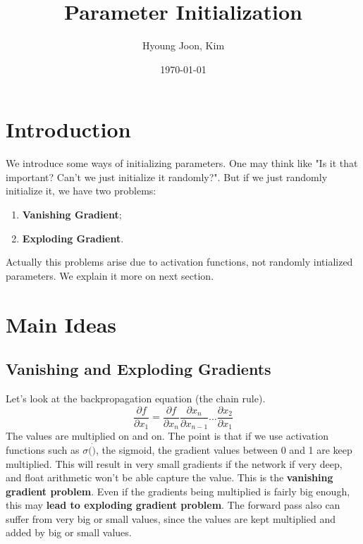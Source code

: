 \documentclass{article}
\title{Parameter Initialization}
\author{Hyoung Joon, Kim}
\date{\today}
\begin{document}
\maketitle
\tableofcontents
\newpage

\section{Introduction}
    We introduce some ways of initializing parameters. One may think like "Is it that important? Can't we just initialize it randomly?".
    But if we just randomly initialize it, we have two problems:
    \begin{enumerate}
        \item \textbf{Vanishing Gradient};
        \item \textbf{Exploding Gradient}.
    \end{enumerate}
    Actually this problems arise due to activation functions, not randomly intialized parameters.
    We explain it more on next section.
\section{Main Ideas}
    \subsection{Vanishing and Exploding Gradients}
        Let's look at the backpropagation equation (the chain rule).
        \[
            \frac{\partial f}{\partial x_1} =
            \frac{\partial f}{\partial x_n}\frac{\partial x_n}{\partial x_{n-1}}\dots\frac{\partial x_2}{\partial x_1}
        \]
        The values are multiplied on and on. The point is that if we use activation functions such as $\sigma(\dot)$, the sigmoid,
        the gradient values between 0 and 1 are keep multiplied. This will result in very small gradients if the network if very deep,
        and float arithmetic won't be able capture the value. This is the \textbf{vanishing gradient problem}.
        Even if the gradients being multiplied is fairly big enough, this may \textbf{lead to exploding gradient problem}.
        The forward pass also can suffer from very big or small values, since the values are kept multiplied and added by big or small values.
\end{document}
